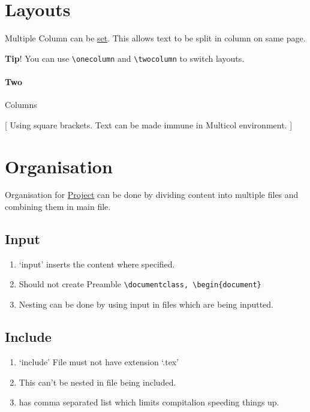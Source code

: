 \documentclass{report}[a4paper,12pt] %
\begin{document}
\section{Layouts}
Multiple Column can be \href{https://www.overleaf.com/learn/latex/Multiple_columns}{set}. This allows text to be split in column on same page.

\begin{tcolorbox}
  \textbf{Tip}! You can use \verb|\onecolumn| and \verb|\twocolumn| to switch layouts.
\end{tcolorbox}

\paragraph{Two} Columns
\begin{multicols}{2}
  \setlength{\columnseprule}{1pt}
  \def\columnseprulecolor{\color{blue}}

  [
  Using square brackets. Text can be made immune in Multicol environment.
  ]
  \lipsum[2]
\end{multicols}

\section{Organisation}
Organisation for \href{https://www.overleaf.com/learn/latex/Management_in_a_large_project}{Project} can be done by dividing content into multiple files
and combining them in main file.

\subsection{Input}
\begin{enumerate}
  \item `input' inserts the content where specified.
  \item Should not create Preamble \verb|\documentclass, \begin{document}|
  \item Nesting can be done by using input in files which are being inputted.
\end{enumerate}

\subsection{Include}
\begin{enumerate}
  \item `include' File must not have extension `.tex'
  \item This can't be nested in file being included.
  \item \verb|| has comma separated list which limits compitalion speeding things up.
\end{enumerate}
\end{document}
